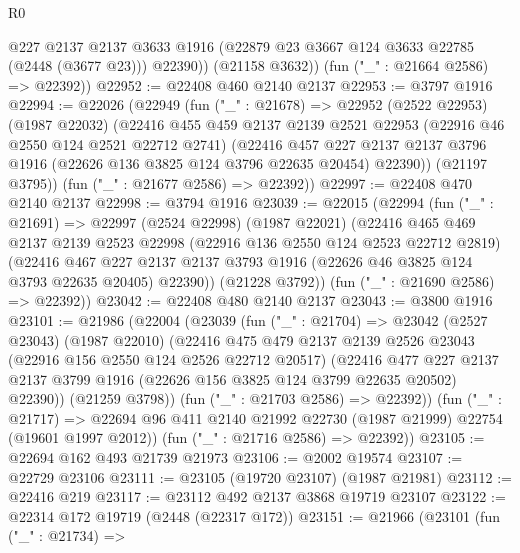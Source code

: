 \begin{lexlean}{R0}
\begin{coremodule}
            @227
            @2137
            @2137
            @3633
            @1916
            (@22879 @23 @3667 @124 @3633 @22785 (@2448 (@3677 @23)))
            @22390))
        (@21158 @3632))
      (fun ("_" : @21664 @2586) => @22392))
@22952 := @22408 @460 @2140 @2137
@22953 := @3797 @1916
@22994 := @22026
    (@22949
      (fun ("_" : @21678) =>
      @22952
        (@2522 @22953)
        (@1987 @22032)
        (@22416
          @455
          @459
          @2137
          @2139
          @2521
          @22953
          (@22916 @46 @2550 @124 @2521 @22712 @2741)
          (@22416
            @457
            @227
            @2137
            @2137
            @3796
            @1916
            (@22626 @136 @3825 @124 @3796 @22635 @20454)
            @22390))
        (@21197 @3795))
      (fun ("_" : @21677 @2586) => @22392))
@22997 := @22408 @470 @2140 @2137
@22998 := @3794 @1916
@23039 := @22015
    (@22994
      (fun ("_" : @21691) =>
      @22997
        (@2524 @22998)
        (@1987 @22021)
        (@22416
          @465
          @469
          @2137
          @2139
          @2523
          @22998
          (@22916 @136 @2550 @124 @2523 @22712 @2819)
          (@22416
            @467
            @227
            @2137
            @2137
            @3793
            @1916
            (@22626 @46 @3825 @124 @3793 @22635 @20405)
            @22390))
        (@21228 @3792))
      (fun ("_" : @21690 @2586) => @22392))
@23042 := @22408 @480 @2140 @2137
@23043 := @3800 @1916
@23101 := @21986
    (@22004
      (@23039
        (fun ("_" : @21704) =>
        @23042
          (@2527 @23043)
          (@1987 @22010)
          (@22416
            @475
            @479
            @2137
            @2139
            @2526
            @23043
            (@22916 @156 @2550 @124 @2526 @22712 @20517)
            (@22416
              @477
              @227
              @2137
              @2137
              @3799
              @1916
              (@22626 @156 @3825 @124 @3799 @22635 @20502)
              @22390))
          (@21259 @3798))
        (fun ("_" : @21703 @2586) => @22392))
      (fun ("_" : @21717) =>
      @22694 @96 @411 @2140 @21992 @22730 (@1987 @21999) @22754 (@19601 @1997 @2012))
      (fun ("_" : @21716 @2586) => @22392))
@23105 := @22694 @162 @493 @21739 @21973
@23106 := @2002 @19574
@23107 := @22729 @23106
@23111 := @23105 (@19720 @23107) (@1987 @21981)
@23112 := @22416 @219
@23117 := @23112 @492 @2137 @3868 @19719 @23107
@23122 := @22314 @172 @19719 (@2448 (@22317 @172))
@23151 := @21966
    (@23101
      (fun ("_" : @21734) =>

\end{coremodule}
\end{lexlean}
